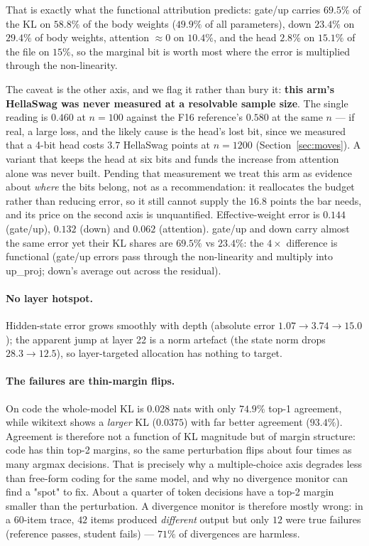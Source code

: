 \documentclass[11pt,a4paper]{article}
\begin{document}
That is exactly what the functional attribution predicts: gate/up carries $69.5\%$ of the KL on
$58.8\%$ of the body weights ($49.9\%$ of all parameters), down $23.4\%$ on $29.4\%$ of body weights,
attention $\approx0$ on $10.4\%$, and the head $2.8\%$ on $15.1\%$ of the file
on $15\%$, so the marginal bit is worth most where the error is multiplied through the
non-linearity.

The caveat is the other axis, and we flag it rather than bury it: \textbf{this arm's HellaSwag was
never measured at a resolvable sample size}. The single reading is $0.460$ at $n=100$ against the
F16 reference's $0.580$ at the same $n$ --- if real, a large loss, and the likely cause is the
head's lost bit, since we measured that a 4-bit head costs $3.7$ HellaSwag points at $n=1200$
(Section~\ref{sec:moves}). A variant that keeps the head at six bits and funds the increase from
attention alone was never built. Pending that measurement we treat this arm as evidence about
\emph{where} the bits belong, not as a recommendation: it reallocates the budget rather than
reducing error, so it still cannot supply the $16.8$ points the bar needs, and its price on the
second axis is unquantified.
 Effective-weight error is $0.144$ (gate/up), $0.132$
(down) and $0.062$ (attention). gate/up and down carry almost the same error yet their KL shares
are $69.5\%$ vs $23.4\%$: the $4\times$ difference is functional (gate/up errors pass through the
non-linearity and multiply into up\_proj; down's average out across the residual).

\paragraph{No layer hotspot.} Hidden-state error grows smoothly with depth (absolute error
$1.07\to3.74\to15.0$); the apparent jump at layer 22 is a norm artefact (the state norm drops
$28.3\to12.5$), so layer-targeted allocation has nothing to target.

\paragraph{The failures are thin-margin flips.} On code the whole-model KL is $0.028$ nats with
only $74.9\%$ top-1 agreement, while wikitext shows a \emph{larger} KL ($0.0375$) with far better
agreement ($93.4\%$). Agreement is therefore not a function of KL magnitude but of margin
structure: code has thin top-2 margins, so the same perturbation flips about four times as many
argmax decisions. That is precisely why a multiple-choice axis degrades less than free-form coding
for the same model, and why no divergence monitor can find a "spot" to fix. About a quarter of token decisions have a
top-2 margin smaller than the perturbation. A divergence monitor is therefore mostly wrong: in a
60-item trace, $42$ items produced \emph{different} output but only $12$ were true failures
(reference passes, student fails) --- $71\%$ of divergences are harmless.
\end{document}
